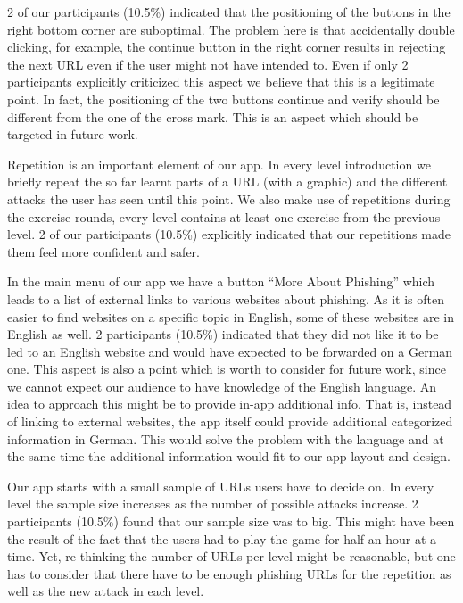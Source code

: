 \begin{description}[leftmargin=0cm]
2 of our participants (10.5\%) indicated that the positioning of the buttons in the right bottom corner are suboptimal.
The problem here is that accidentally double clicking, for example, the continue button in the right corner results in rejecting the next URL even if the user might not have intended to.
Even if only 2 participants explicitly criticized this aspect we believe that this is a legitimate point.
In fact, the positioning of the two buttons continue and verify should be different from the one of the cross mark.
This is an aspect which should be targeted in future work. 
	\item[Repetition]
Repetition is an important element of our app.
In every level introduction we briefly repeat the so far learnt parts of a URL (with a graphic) and the different attacks the user has seen until this point.
We also make use of repetitions during the exercise rounds, every level contains at least one exercise from the previous level.
2 of our participants (10.5\%) explicitly indicated that our repetitions made them feel more confident and safer.
	\item[External Links]
In the main menu of our app we have a button ``More About Phishing'' which leads to a list of external links to various websites about phishing.
As it is often easier to find websites on a specific topic in English, some of these websites are in English as well.
2 participants (10.5\%) indicated that they did not like it to be led to an English website and would have expected to be forwarded on a German one.
This aspect is also a point which is worth to consider for future work, since we cannot expect our audience to have knowledge of the English language.
An idea to approach this might be to provide in-app additional info.
That is, instead of linking to external websites, the app itself could provide additional categorized information in German.
This would solve the problem with the language and at the same time the additional information would fit to our app layout and design.
	\item[Amount of Examples] Our app starts with a small sample of URLs users have to decide on.
In every level the sample size increases as the number of possible attacks increase.
2 participants (10.5\%) found that our sample size was to big.
This might have been the result of the fact that the users had to play the game for half an hour at a time.
Yet, re-thinking the number of URLs per level might be reasonable, but one has to consider that there have to be enough phishing URLs for the repetition as well as the new attack in each level.

\end{description}
